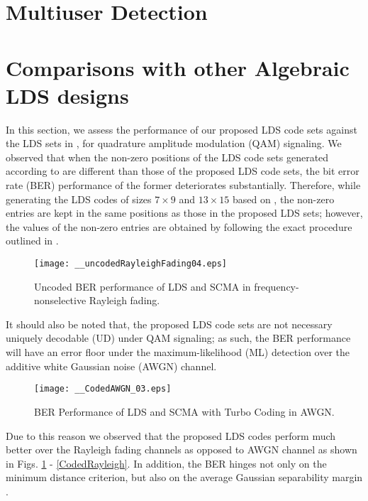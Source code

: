\documentclass[journal,comsoc]{IEEEtran}
\begin{document}
\section{Multiuser Detection}
\label{detection}
\fi
\vspace{-0.2cm}
\section{Comparisons with other Algebraic LDS designs}
\label{simulation}
In this section, we assess the performance of our proposed LDS code sets against the LDS sets in \cite{Mheich2019}, for quadrature amplitude modulation (QAM) signaling. We observed that when the non-zero positions of the LDS code sets generated according to \cite{Mheich2019} are different than those of the proposed LDS code sets, the bit error rate (BER) performance of the former deteriorates substantially. Therefore, while generating the LDS codes of sizes $7 \times 9$ and $13 \times 15$ based on \cite{Mheich2019}, the non-zero entries are kept in the same positions as those in the proposed LDS sets; however, the values of the non-zero entries are obtained by following the exact procedure outlined in \cite{Mheich2019}.
\begin{figure}[h]
\vspace{-.4cm}
	\centering
	\texttt{[image: \_\_uncodedRayleighFading04.eps]}
	\caption{Uncoded BER performance of LDS and SCMA in frequency-nonselective Rayleigh fading.}\label{uncoded}
	\vspace{-.2cm}
\end{figure}
It should also be noted that, the proposed LDS code sets are not necessary uniquely decodable (UD) under QAM signaling; as such, the BER performance will have an error floor under the maximum-likelihood (ML) detection over the additive white Gaussian noise (AWGN) channel.
\begin{figure}[h]
\vspace{-.2cm}
	\centering
	\texttt{[image: \_\_CodedAWGN\_03.eps]}
	\caption{BER Performance of LDS and SCMA with Turbo Coding in AWGN.}\label{CodedAWGN}
	\vspace{-.1cm}
\end{figure}
Due to this reason we observed that the proposed LDS codes perform much better over the Rayleigh fading channels as opposed to AWGN channel as shown in Figs. \ref{uncoded} - \ref{CodedRayleigh}. In addition, the BER hinges not only on the minimum distance criterion, but also on the average Gaussian separability margin \cite{MichelHanzo2021}.
\end{document}
